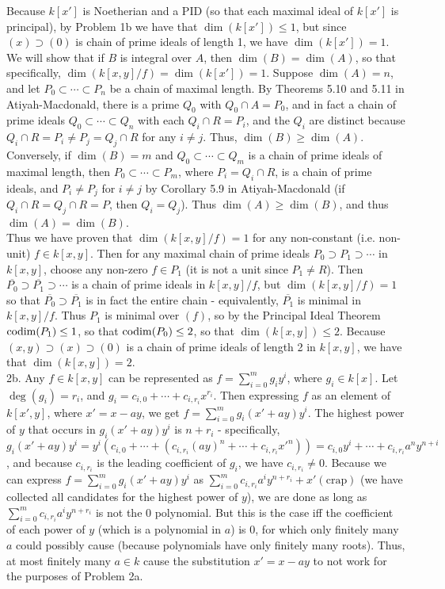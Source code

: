 \documentclass[11pt]{article}
\begin{document}
Because $k[x']$ is Noetherian and a PID (so that each maximal ideal of $k[x']$ is principal), by Problem 1b we have that $\dim(k[x'])\leq1$, but since $(x)\supset (0)$ is chain of prime ideals of length 1, we have $\dim(k[x'])=1$. We will show that if $B$ is integral over $A$, then $\dim(B)=\dim(A)$, so that specifically, $\dim(k[x,y]/f)=\dim(k[x'])=1$. Suppose $\dim(A)=n$, and let $P_0\subset\cdots\subset P_n$ be a chain of maximal length. By Theorems 5.10 and 5.11 in Atiyah-Macdonald, there is a prime $Q_0$ with $Q_0\cap A=P_0$, and in fact a chain of prime ideals $Q_0\subset \cdots\subset Q_n$ with each $Q_i\cap R=P_i$, and the $Q_i$ are distinct because $Q_i\cap R=P_i\neq P_j=Q_j\cap R$ for any $i\neq j$. Thus, $\dim(B)\geq\dim(A)$. Conversely, if $\dim(B)=m$ and $Q_0\subset\cdots\subset Q_m$ is a chain of prime ideals of maximal length, then $P_0\subset\cdots\subset P_m$, where $P_i=Q_i\cap R$, is a chain of prime ideals, and $P_i\neq P_j$ for $i\neq j$ by Corollary 5.9 in Atiyah-Macdonald (if $Q_i\cap R=Q_j\cap R=P$, then $Q_i=Q_j$). Thus $\dim(A)\geq\dim(B)$, and thus $\dim(A)=\dim(B)$.\\

Thus we have proven that $\dim(k[x,y]/f)=1$ for any non-constant (i.e. non-unit) $f\in k[x,y]$. Then for any maximal chain of prime ideals $P_0\supset P_1\supset\cdots$ in $k[x,y]$, choose any non-zero $f\in P_1$ (it is not a unit since $P_1\neq R$). Then $\overline{P_0}\supset \overline{P_1}\supset\cdots$ is a chain of prime ideals in $k[x,y]/f$, but $\dim(k[x,y]/f)=1$ so that $\overline{P_0}\supset\overline{P_1}$ is in fact the entire chain - equivalently, $\overline{P_1}$ is minimal in $k[x,y]/f$. Thus $P_1$ is minimal over $(f)$, so by the Principal Ideal Theorem $\operatorname{codim}(P_1)\leq 1$, so that $\operatorname{codim}(P_0)\leq 2$, so that $\dim(k[x,y])\leq2$. Because $(x,y)\supset (x)\supset (0)$ is a chain of prime ideals of length 2 in $k[x,y]$, we have that $\dim(k[x,y])=2$.   \\

\num{2b.} Any $f\in k[x,y]$ can be represented as $f=\sum_{i=0}^m g_iy^i$, where $g_i\in k[x]$. Let $\deg(g_i)=r_i$, and $g_i=c_{i,0}+\cdots+c_{i,r_i}x^{r_i}$. Then expressing $f$ as an element of $k[x',y]$, where $x'=x-ay$, we get $f=\sum_{i=0}^m g_i(x'+ay)y^i$. The highest power of $y$ that occurs in $g_i(x'+ay)y^i$ is $n+r_i$ - specifically, $g_i(x'+ay)y^i=y^i(c_{i,0}+\cdots+(c_{i,r_i}(ay)^n+\cdots+c_{i,r_i}x'^n))=c_{i,0}y^i+\cdots+c_{i,r_i}a^ny^{n+i}$, and because $c_{i,r_i}$ is the leading coefficient of $g_i$, we have $c_{i,r_i}\neq0$. Because we can express $f=\sum_{i=0}^m g_i(x'+ay)y^i$ as $\sum_{i=0}^m c_{i,r_i}a^iy^{n+r_i} + x'(\text{crap})$ (we have collected all candidates for the highest power of $y$), we are done as long as $\sum_{i=0}^m c_{i,r_i}a^iy^{n+r_i}$ is not the 0 polynomial. But this is the case iff the coefficient of each power of $y$ (which is a polynomial in $a$) is 0, for which only finitely many $a$ could possibly cause (because polynomials have only finitely many roots). Thus, at most finitely many $a\in k$ cause the substitution $x'=x-ay$ to not work for the purposes of Problem 2a.    \\
\end{document}
